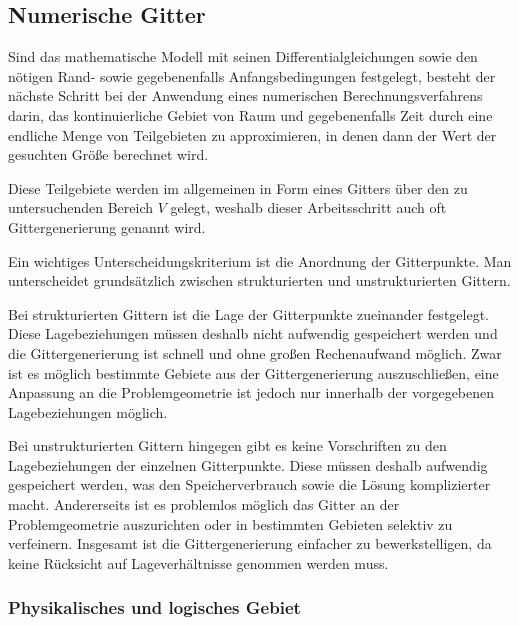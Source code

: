 \subsection{Numerische Gitter}
\label{sec:num_gitter}

Sind das mathematische Modell mit seinen Differentialgleichungen sowie den nötigen
Rand- sowie gegebenenfalls Anfangsbedingungen festgelegt, besteht der nächste Schritt
bei der Anwendung eines numerischen Berechnungsverfahrens darin, das kontinuierliche
Gebiet von Raum und gegebenenfalls Zeit durch eine endliche Menge von Teilgebieten zu approximieren,
in denen dann der Wert der gesuchten Größe berechnet wird.

Diese Teilgebiete werden im allgemeinen in Form eines Gitters über den zu untersuchenden
Bereich $V$ gelegt, weshalb dieser Arbeitsschritt auch oft Gittergenerierung genannt wird.

Ein wichtiges Unterscheidungskriterium ist die Anordnung der Gitterpunkte.
Man unterscheidet grundsätzlich zwischen strukturierten und unstrukturierten Gittern.

Bei strukturierten Gittern ist die Lage der Gitterpunkte zueinander festgelegt. Diese
Lagebeziehungen müssen deshalb nicht aufwendig gespeichert werden und die Gittergenerierung
ist schnell und ohne großen Rechenaufwand möglich. Zwar ist es möglich bestimmte Gebiete
aus der Gittergenerierung auszuschließen, eine Anpassung an die Problemgeometrie ist
jedoch nur innerhalb der vorgegebenen Lagebeziehungen möglich.

Bei unstrukturierten Gittern hingegen gibt es keine Vorschriften zu den Lagebeziehungen
der einzelnen Gitterpunkte. Diese müssen deshalb aufwendig gespeichert werden, was
den Speicherverbrauch sowie die Lösung komplizierter macht. Andererseits ist es problemlos möglich
das Gitter an der Problemgeometrie auszurichten oder in bestimmten Gebieten selektiv zu verfeinern.
Insgesamt ist die Gittergenerierung einfacher zu bewerkstelligen, da keine Rücksicht auf Lageverhältnisse
genommen werden muss.

\subsubsection{Physikalisches und logisches Gebiet}


